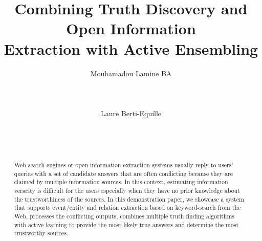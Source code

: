 \documentclass{sig-alternate}
\begin{document}
\conferenceinfo{}{}

\title{Combining Truth Discovery and Open Information\\ Extraction with Active Ensembling}

\author{
\alignauthor
Mouhamadou Lamine BA\\
       \\
       \\
       \\
\alignauthor
Laure Berti-Equille\\
       \\
       \\
       \\
}


\maketitle

\begin{abstract}
Web search engines or open information extraction systems usually reply to
users' queries with a set of candidate answers that are often conflicting 
because they are claimed by multiple information sources. In this context, 
estimating information veracity is difficult for the users  especially when
they have no prior knowledge about the trustworthiness of the sources. In this
demonstration paper, we showcase a system that supports event/entity and relation
extraction based on keyword-search from the Web, processes the conflicting outputs, 
combines multiple truth finding algorithms with active learning to provide the most 
likely true answers and determine the most trustworthy sources. 
\end{abstract}

\end{document}
